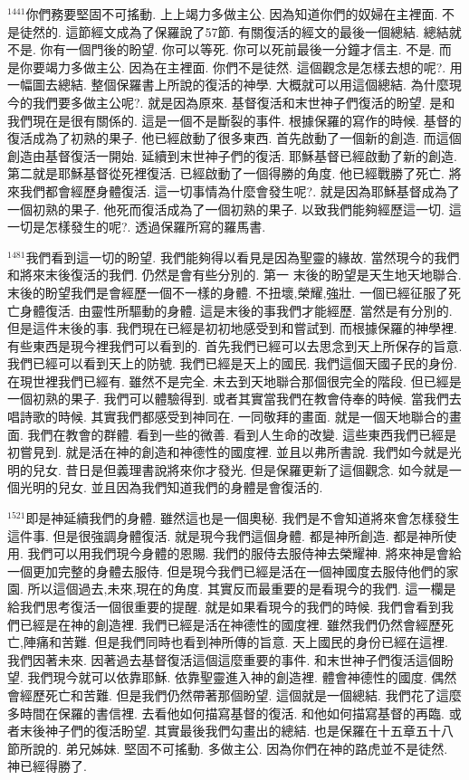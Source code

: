 \documentclass{book}
\begin{document}
$^{1441}$你們務要堅固不可搖動.
上上竭力多做主公.
因為知道你們的奴婦在主裡面.
不是徒然的.
這節經文成為了保羅說了57節.
有關復活的經文的最後一個總結.
總結就不是.
你有一個門後的盼望.
你可以等死.
你可以死前最後一分鐘才信主.
不是.
而是你要竭力多做主公.
因為在主裡面.
你們不是徒然.
這個觀念是怎樣去想的呢?.
用一幅圖去總結.
整個保羅書上所說的復活的神學.
大概就可以用這個總結.
為什麼現今的我們要多做主公呢?.
就是因為原來.
基督復活和末世神子們復活的盼望.
是和我們現在是很有關係的.
這是一個不是斷裂的事件.
根據保羅的寫作的時候.
基督的復活成為了初熟的果子.
他已經啟動了很多東西.
首先啟動了一個新的創造.
而這個創造由基督復活一開始.
延續到末世神子們的復活.
耶穌基督已經啟動了新的創造.
第二就是耶穌基督從死裡復活.
已經啟動了一個得勝的角度.
他已經戰勝了死亡.
將來我們都會經歷身體復活.
這一切事情為什麼會發生呢?.
就是因為耶穌基督成為了一個初熟的果子.
他死而復活成為了一個初熟的果子.
以致我們能夠經歷這一切.
這一切是怎樣發生的呢?.
透過保羅所寫的羅馬書.

$^{1481}$我們看到這一切的盼望.
我們能夠得以看見是因為聖靈的緣故.
當然現今的我們和將來末後復活的我們.
仍然是會有些分別的.
第一 末後的盼望是天生地天地聯合.
末後的盼望我們是會經歷一個不一樣的身體.
不扭壞,榮耀,強壯.
一個已經征服了死亡身體復活.
由靈性所驅動的身體.
這是末後的事我們才能經歷.
當然是有分別的.
但是這件末後的事.
我們現在已經是初初地感受到和嘗試到.
而根據保羅的神學裡.
有些東西是現今裡我們可以看到的.
首先我們已經可以去思念到天上所保存的旨意.
我們已經可以看到天上的防號.
我們已經是天上的國民.
我們這個天國子民的身份.
在現世裡我們已經有.
雖然不是完全.
未去到天地聯合那個很完全的階段.
但已經是一個初熟的果子.
我們可以體驗得到.
或者其實當我們在教會侍奉的時候.
當我們去唱詩歌的時候.
其實我們都感受到神同在.
一同敬拜的畫面.
就是一個天地聯合的畫面.
我們在教會的群體.
看到一些的微善.
看到人生命的改變.
這些東西我們已經是初嘗見到.
就是活在神的創造和神德性的國度裡.
並且以弗所書說.
我們如今就是光明的兒女.
昔日是但義理書說將來你才發光.
但是保羅更新了這個觀念.
如今就是一個光明的兒女.
並且因為我們知道我們的身體是會復活的.

$^{1521}$即是神延續我們的身體.
雖然這也是一個奧秘.
我們是不會知道將來會怎樣發生這件事.
但是很強調身體復活.
就是現今我們這個身體.
都是神所創造.
都是神所使用.
我們可以用我們現今身體的恩賜.
我們的服侍去服侍神去榮耀神.
將來神是會給一個更加完整的身體去服侍.
但是現今我們已經是活在一個神國度去服侍他們的家園.
所以這個過去,未來,現在的角度.
其實反而最重要的是看現今的我們.
這一欄是給我們思考復活一個很重要的提醒.
就是如果看現今的我們的時候.
我們會看到我們已經是在神的創造裡.
我們已經是活在神德性的國度裡.
雖然我們仍然會經歷死亡,陣痛和苦難.
但是我們同時也看到神所傳的旨意.
天上國民的身份已經在這裡.
我們因著未來.
因著過去基督復活這個這麼重要的事件.
和末世神子們復活這個盼望.
我們現今就可以依靠耶穌.
依靠聖靈進入神的創造裡.
體會神德性的國度.
偶然會經歷死亡和苦難.
但是我們仍然帶著那個盼望.
這個就是一個總結.
我們花了這麼多時間在保羅的書信裡.
去看他如何描寫基督的復活.
和他如何描寫基督的再臨.
或者末後神子們的復活盼望.
其實最後我們勾畫出的總結.
也是保羅在十五章五十八節所說的.
弟兄姊妹.
堅固不可搖動.
多做主公.
因為你們在神的路虎並不是徒然.
神已經得勝了.
\end{document}
